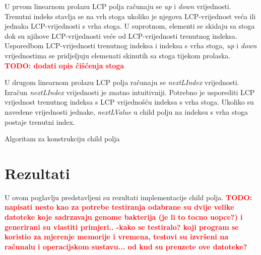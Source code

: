 \documentclass[times, utf8, seminar, numeric]{fer}
\newcommand\todo[1]{\textbf{\textcolor{red}{TODO: #1}}}
\begin{document}
U prvom linearnom prolazu LCP polja računaju se \textit{up} i \textit{down} vrijednosti. Trenutni indeks stavlja se na vrh stoga ukoliko je njegova LCP-vrijednost veća ili jednaka LCP-vrijednosti s vrha stoga. U suprotnom, elementi se skidaju sa stoga dok su njihove LCP-vrijednosti veće od LCP-vrijednosti trenutnog indeksa. Usporedbom LCP-vrijednosti trenutnog indeksa i indeksa s vrha stoga, \textit{up} i \textit{down} vrijednostima se pridjeljuju elemenati skinutih sa stoga tijekom prolaska. \todo{dodati opis čišćenja stoga}

U drugom linearnom prolazu LCP polja računaju se \textit{nextLIndex} vrijednosti. Izračun \textit{nextLIndex} vrijednosti je znatno intuitivniji. Potrebno je usporediti LCP vrijednost trenutnog indeksa s LCP vrijednošću indeksa s vrha stoga. Ukoliko su navedene vrijednosti jednake, \textit{nextLValue} u child polju na indeksu s vrha stoga  postaje trenutni index.

\begin{algorithm}[h]
	\caption{Algoritam za konstrukciju child polja}
	\label{alg:child-array}

	
\end{algorithm}

\chapter{Rezultati}
U ovom poglavlju predstavljeni su rezultati implementacije child polja. \todo{napisati nesto kao za potrebe testiranja odabrane su dvije velike datoteke koje sadrzavaju genome bakterija (je li to tocno uopce?) i generirani su vlastiti primjeri.. -kako se testiralo? koji program se koristio za mjerenje memorije i vremena, testovi su izvršeni na računalu i operacijskom sustavu... od kud su preuzete ove datoteke?}
\end{document}
